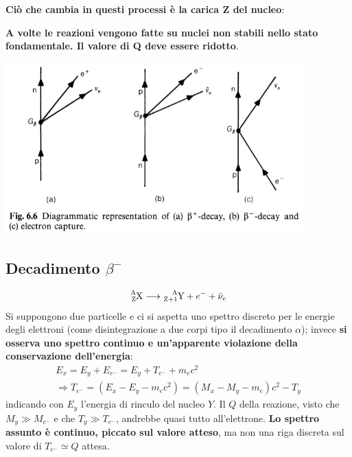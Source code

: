 \documentclass[a4paper,11pt,twoside,openany]{book}
\theoremstyle{definition}
\theoremstyle{plain}
\theoremstyle{plain}
\theoremstyle{definition}
\begin{document}
\textbf{Ciò che cambia in questi processi è la carica Z del nucleo}: 

\textbf{A volte le reazioni vengono fatte su nuclei non stabili nello stato fondamentale. Il valore di Q deve essere ridotto}.

\begin{center}
\includegraphics[width=4.5in]{immagini/beta-dacay.jpg} %
\end{center}

\subsection{Decadimento $\beta^-$} %
\begin{equation}\begin{split}
\ce{^A_ZX}\longrightarrow \ce{^A_{Z+1}Y}+e^-+\bar\nu_e
\end{split}\end{equation}
Si suppongono due particelle e ci si aspetta uno spettro discreto per le energie degli elettroni (come disintegrazione a due corpi tipo il decadimento $\alpha$); invece \textbf{si osserva uno spettro continuo e un'apparente violazione della conservazione dell'energia}:
\begin{equation}\begin{split}
E_x=E_y+E_{e^-}=E_y+T_{e^-}+m_ec^2\\
\Longrightarrow T_{e^-}=\left(E_x-E_y-m_ec^2\right)=\left(M_x-M_y-m_e\right)c^2-T_y
\end{split}\end{equation}
indicando con $E_y$ l'energia di rinculo del nucleo $Y$. Il $Q$ della reazione, visto che $M_y\gg M_{e^-}$ e che $T_y\gg T_{e^-}$, andrebbe quasi tutto all'elettrone. \textbf{Lo spettro assunto è continuo, piccato sul valore atteso}, ma non una riga discreta sul valore di $T_{e^-}\simeq Q$ attesa.
\end{document}
